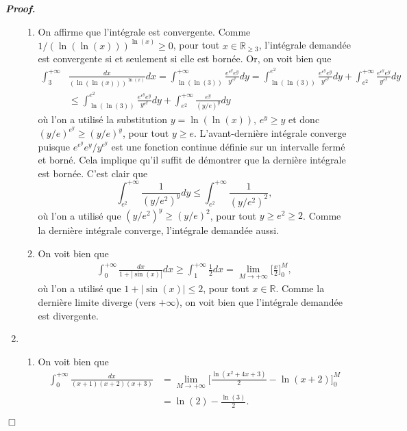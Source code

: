 \documentclass[11pt,a4paper]{article}
\newcommand{\RR}{\mathbb{R}}
\newenvironment{preuve}[1][]
{\vskip 2mm  \noindent\emph{\bf Proof#1. }}{$\Box$ \vskip 2mm}
\let\geq\geqslant
\let\leq\leqslant
\begin{document}
\begin{preuve}
\begin{enumerate}
\begin{enumerate}[label=(\roman*)]
				\item On affirme que l'intégrale est convergente. 
				Comme $1/(\ln (\ln (x)))^{\ln (x)} \geq 0$, pour tout $x \in \RR_{\geq 3}$, l'intégrale demandée est convergente si et seulement si elle est bornée. 
				Or, on voit bien que 
				\begin{align*}
				\int_{3}^{+\infty} &\frac{dx}{(\ln (\ln (x)))^{\ln (x)}} dx = \int_{\ln(\ln(3))}^{+\infty} \frac{e^{e^{y}}e^{y}}{y^{e^{y}}} dy = 
				\int_{\ln(\ln(3))}^{e^{2}} \frac{e^{e^{y}}e^{y}}{y^{e^{y}}} dy +  \int_{e^{2}}^{+\infty} \frac{e^{e^{y}}e^{y}}{y^{e^{y}}} dy     
				\\
				&\leq \int_{\ln(\ln(3))}^{e^{2}} \frac{e^{e^{y}}e^{y}}{y^{e^{y}}} dy + \int_{e^{2}}^{+\infty} \frac{e^{y}}{(y/e)^{y}} dy 
				\end{align*}
				où l'on a utilisé la substitution $y = \ln(\ln(x))$, $e^{y} \geq y$ et donc $(y/e)^{e^{y}} \geq (y/e)^{y}$, pour tout $y \geq e$. 
				L'avant-dernière intégrale converge puisque $e^{e^{y}}e^{y}/y^{e^{y}}$ est une fonction continue définie sur un intervalle fermé et borné. 
				Cela implique qu'il suffit de démontrer que la dernière intégrale est bornée.
				C'est clair que 
				\[     \int_{e^{2}}^{+\infty} \frac{1}{(y/e^{2})^{y}} dy \leq \int_{e^{2}}^{+\infty} \frac{1}{(y/e^{2})^{2}},     \]
				où l'on a utilisé que $(y/e^{2})^{y} \geq (y/e)^{2}$, pour tout $y \geq e^{2} \geq 2$. 
				Comme la dernière intégrale converge, l'intégrale demandée aussi. 
				
				\item On voit bien que 
				\begin{align*}
				\int_{0}^{+\infty} \frac{dx}{1+| \sin (x)| } dx \geq \int_{1}^{+\infty} \frac{1}{2} dx = \underset{M \rightarrow + \infty}{\lim} \bigg[ \frac{x}{2} \bigg]_{0}^{M},     
				\end{align*}
				où l'on a utilisé que $1 + |\sin(x)| \leq 2$, pour tout $x \in \RR$. 
				Comme la dernière limite diverge (vers $+ \infty$), on voit bien que l'intégrale demandée est divergente. 
				
			\end{enumerate}
			
			\item 
			\begin{enumerate}[label=(\roman*)]
				\item On voit bien que 
				\begin{align*}
				\int_{0}^{+\infty} \frac{dx}{(x+1)(x+2)(x+3)} &= \underset{M \rightarrow + \infty}{\lim} \bigg[ \frac{\ln(x^{2}+4x+3)}{2} - \ln(x+2) \bigg]_{0}^{M} 
				\\
				&= \ln(2) - \frac{\ln(3)}{2}.     
				\end{align*}
				

\end{enumerate}
\end{enumerate}
\end{preuve}
\end{document}
